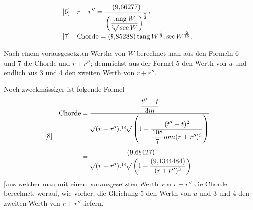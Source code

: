 \[
\begin{array}{l@{\quad}l}
[6]&\displaystyle r+r''=\frac{(9{,}66277)}{\left(\dfrac{\operatorname{tang}W}{\BareRoot[5]{\sec W}}\right)^{\frac{2}{3}}}\mathpunct{\raisebox{.45ex}{,}}\\[8pt]
[7]&\displaystyle\text{Chorde}=(9{,}85288)\operatorname{tang}W^{\frac{1}{3}}\mathord{.}\sec W^{\frac{2}{15}}.
\end{array}
\]

Nach einem vorausgesetzten Werthe von \(W\) berechnet man aus den Formeln 6 und 7 die Chorde und \(r+r''\); demnächst aus der Formel 5 den Werth von \(u\) und endlich aus 3 und 4 den zweiten Werth von \(r+r''\).

Noch zweckmässiger ist folgende Formel
\[
\begin{array}{l@{\quad}l}
[8]&\begin{aligned}
\text{Chorde}&=\frac{\dfrac{t''-t}{3m}}{\BareRoot{(r+r'')}\mathord{.}\BareRoot[14]{\left(1-\dfrac{(t''-t)^2}{\dfrac{108}{7}mm(r+r'')^3}\right)}}\\[5pt]
&=\frac{(9{,}68427)}{\BareRoot{(r+r'')}\mathord{.}\BareRoot[14]{\left(1-\dfrac{(9{,}1344484)}{(r+r'')^3}\right)}}
\end{aligned}
\end{array}
\]
[aus welcher man mit einem vorausgesetzten Werth von \(r+r''\) die Chorde berechnet, worauf, wie vorher, die Gleichung 5 den Werth von \(u\) und 3 und 4 den zweiten Werth von \(r+r''\) liefern.

